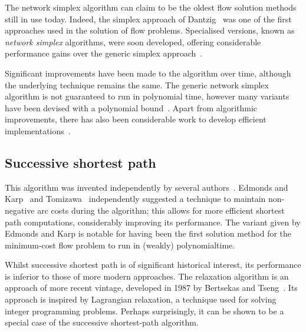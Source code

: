 The network simplex algorithm can claim to be the oldest flow solution methods still in use today. Indeed, the simplex approach of Dantzig~\cite{Dantzig:1949} was one of the first approaches used in the solution of flow problems. Specialised versions, known as \emph{network simplex} algorithms, were soon developed, offering considerable performance gains over the generic simplex approach~\cite{Dantzig:1962}.

Significant improvements have been made to the algorithm over time, although the underlying technique remains the same. The generic network simplex algorithm is not guaranteed to run in polynomial time\footnotemark, however many variants have been devised with a polynomial bound~\cite{Tarjan:1991,Goldfarb:1992}. Apart from algorithmic improvements, there has also been considerable work to develop efficient implementations~\cite{Lobel:1996,Grigoriadis:1986}.

\subsection{Successive shortest path}

This algorithm was invented independently by several authors~\cite{Jewell:1958,Iri:1960,BusackerGowen:1960}. Edmonds and Karp~\cite{Edmonds:1972} and Tomizawa~\cite{Tomizawa:1971} independently suggested a technique to maintain non-negative arc costs during the algorithm; this allows for more efficient shortest path computations, considerably improving its performance. The variant given by Edmonds and Karp is notable for having been the first solution method for the minimum-cost flow problem to run in (weakly) polynomial\footnotemark time.


Whilst successive shortest path is of significant historical interest, its performance is inferior to those of more modern approaches. The relaxation algorithm is an approach of more recent vintage, developed in 1987 by Bertsekas and Tseng~\cite{BertsekasMethod:1988,BertsekasCodes:1988}. Its approach is inspired by Lagrangian relaxation, a technique used for solving integer programming problems. Perhaps surprisingly, it can be shown to be a special case of the successive shortest-path algorithm.

